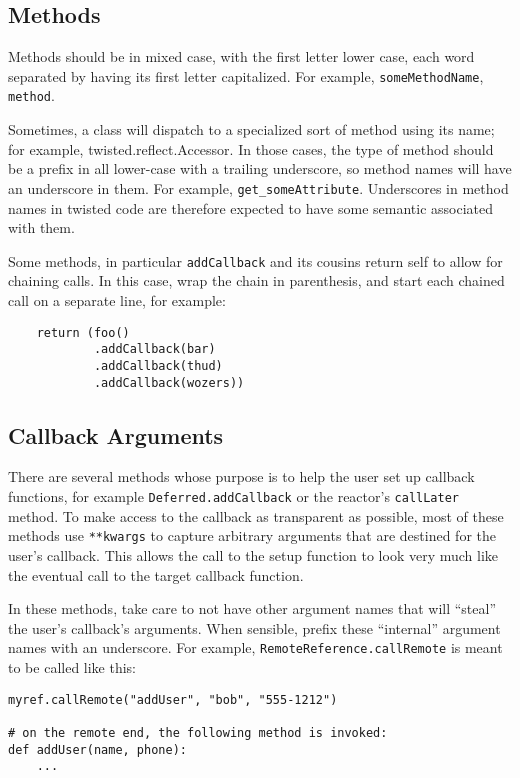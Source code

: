 \subsection{Methods}


Methods should be in mixed case, with the first letter lower     case, each word separated by having its first letter     capitalized. For example, \texttt{some\linebreak[1]Method\linebreak[1]Name},      \texttt{method}.

Sometimes, a class will dispatch to a specialized sort of     method using its name; for example, twisted.reflect.Accessor.     In those cases, the type of method should be a prefix in all     lower-case with a trailing underscore, so method names will     have an underscore in them. For example, \texttt{get\_some\linebreak[1]Attribute}.     Underscores in method names in twisted code are therefore     expected to have some semantic associated with them.

Some methods, in particular \texttt{add\linebreak[1]Callback} and its     cousins return self to allow for chaining calls.  In this case,     wrap the chain in parenthesis, and start each chained call on     a separate line, for example:\begin{verbatim}
    return (foo()
            .addCallback(bar)
            .addCallback(thud)
            .addCallback(wozers))
\end{verbatim}


\subsection{Callback Arguments}


There are several methods whose purpose is to help the user set up     callback functions, for example \texttt{Deferred.\linebreak[1]add\linebreak[1]Callback} or the     reactor's \texttt{call\linebreak[1]Later} method. To make     access to the callback as transparent as possible, most of these methods     use \texttt{**kwargs} to capture arbitrary arguments     that are destined for the user's callback. This allows the call to the     setup function to look very much like the eventual call to the target     callback function.

In these methods, take care to not have other argument names that will     ``steal'' the user's callback's arguments. When sensible, prefix these     ``internal'' argument names with an underscore. For example, \texttt{Remote\linebreak[1]Reference.\linebreak[1]call\linebreak[1]Remote} is     meant to be called like this:\begin{verbatim}
myref.callRemote("addUser", "bob", "555-1212")

# on the remote end, the following method is invoked:
def addUser(name, phone):
    ...
\end{verbatim}


